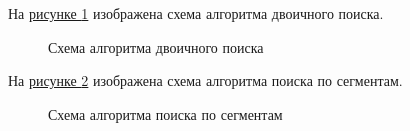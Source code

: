 \documentclass{article}
\begin{document}
		На \hyperref[binarySearchAlg]{рисунке \ref{binarySearchAlg}} изображена схема алгоритма двоичного поиска.
	\begin{figure}[h!]
		\caption{Схема алгоритма двоичного поиска}
		\label{binarySearchAlg}
	\end{figure}
	\newpage

На \hyperref[segmentAlg]{рисунке \ref{segmentAlg}} изображена схема алгоритма поиска по сегментам.
	\begin{figure}[h!]
		\caption{Схема алгоритма поиска по сегментам}
		\label{segmentAlg}
	\end{figure}
	\newpage
\end{document}
